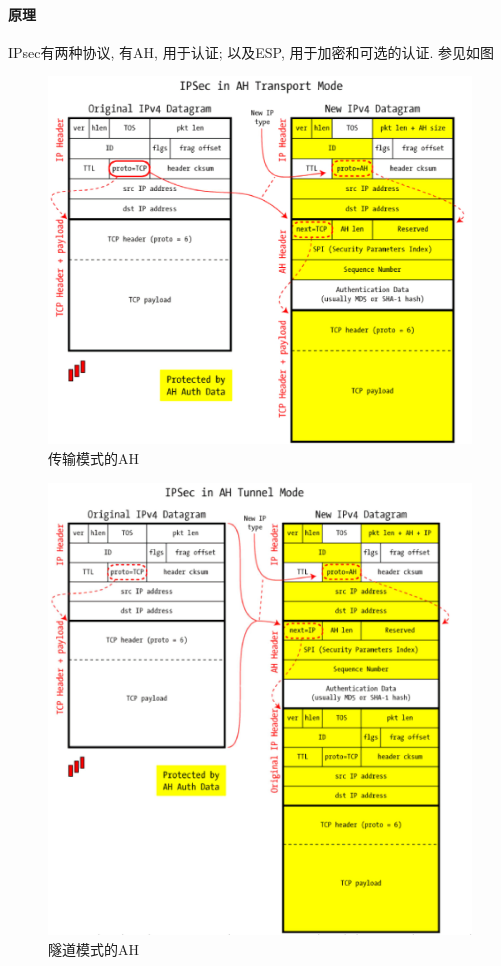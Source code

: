 \documentclass{ctexart}
\begin{document}
\paragraph{原理} IPsec有两种协议, 有AH, 用于认证; 以及ESP, 用于加密和可选的认证. 参见如图\par
    \begin{figure}[ht!]
    \centering
    \includegraphics[width=1.0\textwidth]{ah-transport.png}
    \caption{传输模式的AH}
    \label{ah-transport}
    \end{figure}

    \begin{figure}[ht!]
    \centering
    \includegraphics[width=1.0\textwidth]{ah-tunnel.png}
    \caption{隧道模式的AH}
    \label{ah-tunnel}
    \end{figure}
\end{document}
